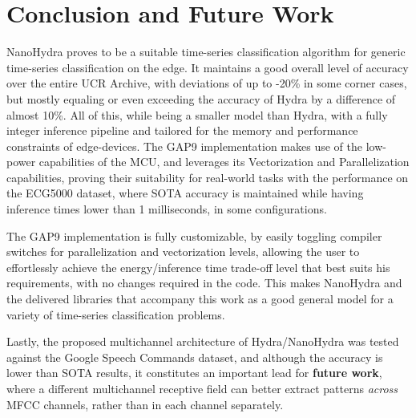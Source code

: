 \chapter{Conclusion and Future Work}
\label{ch:conclusion}


NanoHydra proves to be a suitable time-series classification algorithm for generic time-series classification on the edge. It maintains a good overall level of accuracy
over the entire UCR Archive, with deviations of up to -20\% in some corner cases, but mostly equaling or even exceeding the accuracy of Hydra by a difference of almost 10\%. All of this, 
while being a smaller model than Hydra, with a fully integer inference pipeline and tailored for the memory and performance constraints of edge-devices. The GAP9 implementation
makes use of the low-power capabilities of the MCU, and leverages its Vectorization and Parallelization capabilities, proving their suitability for real-world tasks with the 
performance on the ECG5000 dataset, where SOTA accuracy is maintained while having inference times lower than 1 milliseconds, in some configurations. 

The GAP9 implementation is fully customizable, by easily toggling compiler switches for parallelization and vectorization levels, allowing the user to effortlessly achieve the energy/inference time trade-off level
that best suits his requirements, with no changes required in the code. This makes NanoHydra and the delivered libraries that accompany this work as a good general model for a variety of time-series classification
problems.

Lastly, the proposed multichannel architecture of Hydra/NanoHydra was tested against the Google Speech Commands dataset, and although the accuracy is lower than SOTA results, it constitutes
an important lead for \textbf{future work}, where a different multichannel receptive field can better extract patterns \emph{across} MFCC channels, rather than in each channel separately.
